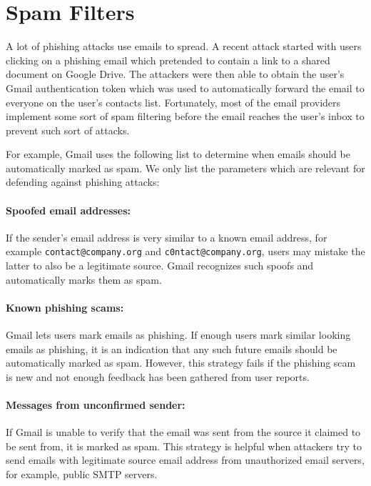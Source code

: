 \section{Spam Filters}

A lot of phishing attacks use emails to spread. A recent attack \cite{google-docs-phishing} started with users clicking on a phishing email which pretended to contain a link to a shared document on Google Drive. The attackers were then able to obtain the user's Gmail authentication token which was used to automatically forward the email to everyone on the user's contacts list. Fortunately, most of the email providers implement some sort of spam filtering before the email reaches the user's inbox to prevent such sort of attacks.

For example, Gmail uses the following list \cite{gmail-spam-filter-list} to determine when emails should be automatically marked as spam. We only list the parameters which are relevant for defending against phishing attacks:

\paragraph{Spoofed email addresses:} If the sender's email address is very similar to a known email address, for example {\tt contact@company.org} and {\tt c0ntact@company.org}, users may mistake the latter to also be a legitimate source. Gmail recognizes such spoofs and automatically marks them as spam.

\paragraph{Known phishing scams:} Gmail lets users mark emails as phishing. If enough users mark similar looking emails as phishing, it is an indication that any such future emails should be automatically marked as spam. However, this strategy fails if the phishing scam is new and not enough feedback has been gathered from user reports.

\paragraph{Messages from unconfirmed sender:} If Gmail is unable to verify that the email was sent from the source it claimed to be sent from, it is marked as spam. This strategy is helpful when attackers try to send emails with legitimate source email address from unauthorized email servers, for example, public SMTP servers.

